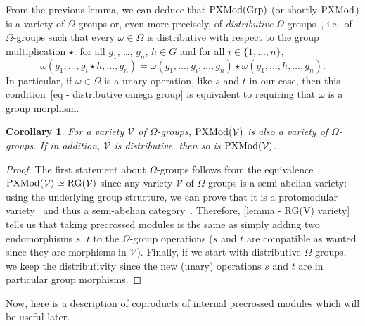\documentclass[a4paper, british, reqno]{amsart}
\newcommand*{\Equiv}{\simeq}
\newcommand*{\CatSymb}[1]{\mathcal{#1}}
\newcommand*{\CatName}[1]{\textnormal{#1}}
\newcommand*{\defn}[1]{\emph{#1}}
\newcommand*{\V}{\CatSymb{V}}
\newcommand*{\Grp}{\CatName{Grp}}
\newcommand*{\PXMod}{\CatName{PXMod}}
\newcommand*{\RG}{\CatName{RG}}
\newtheorem{corollary}[theorem]{Corollary}
\theoremstyle{definition}
\theoremstyle{remark}
\begin{document}
From the previous lemma, we can deduce that \(\PXMod(\Grp)\) (or shortly \(\PXMod\)) is a variety of \(\Omega\)-groups or, even more precisely, of \defn{distributive} \(\Omega\)-groups~\cite{Hig56}, i.e.\ of \(\Omega\)-groups such that every \(\omega\in \Omega\) is distributive with respect to the group multiplication \(\star\): for all \(g_1\), \dots, \(g_n\), \(h\in G\) and for all \(i \in \{1, \dots, n\}\),
\begin{equation}
	\label{eq - distributive omega group}
	\omega(g_1,\dots , g_i\star h,\dots, g_n)=\omega(g_1,\dots, g_i,\dots, g_n)\star \omega(g_1,\dots, h,\dots, g_n)\text{.}
\end{equation}
In particular, if \(\omega\in \Omega\) is a unary operation, like \(s\) and \(t\) in our case, then this condition~\eqref{eq - distributive omega group} is equivalent to requiring that \(\omega\) is a group morphism.

\begin{corollary}
	\label{cor:PXMod(V) omega distributive if V is so}
	For a variety \(\V\) of \(\Omega\)-groups, \(\PXMod(\V)\) is also a variety of \(\Omega\)-groups. If in addition, \(\V\) is distributive, then so is \(\PXMod(\V)\).
\end{corollary}

\begin{proof}
	The first statement about \(\Omega\)-groups follows from the equivalence \(\PXMod(\V) \Equiv \RG(\V)\) since any variety \(\V\) of \(\Omega\)-groups is a semi-abelian variety: using the underlying group structure, we can prove that it is a protomodular variety~\cite{BJ2003} and thus a semi-abelian category~\cite{JMT02}. Therefore, \cref{lemma - RG(V) variety} tells us that taking precrossed modules is the same as simply adding two endomorphisms \(s\), \(t\) to the \(\Omega\)-group operations (\(s\) and \(t\) are compatible as wanted since they are morphisms in \(\V\)). Finally, if we start with distributive \(\Omega\)-groups, we keep the distributivity since the new (unary) operations \(s\) and \(t\) are in particular group morphisms.
\end{proof}


Now, here is a description of coproducts of internal precrossed modules which will be useful later.
\end{document}
